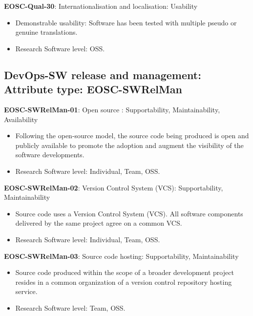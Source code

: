 \textbf{EOSC-Qual-30}: Internationalisation and localisation: Usability

\begin{itemize}
    \item Demonstrable usability: Software has been tested with multiple pseudo or genuine translations. \cite{shepherdson_cessda_2019}
    \item Research Software level: OSS.
\end{itemize}

\subsection{DevOps-SW release and management: Attribute type: EOSC-SWRelMan}

\textbf{EOSC-SWRelMan-01}: Open source : Supportability, Maintainability, Availability

\begin{itemize}
    \item Following the open-source model, the source code being produced is open and publicly available to promote the adoption and augment the visibility of the software developments. \cite{orviz_set_2017,raymond_software_2013}
    \item Research Software level: Individual, Team, OSS.
\end{itemize}

\textbf{EOSC-SWRelMan-02}: Version Control System (VCS): Supportability, Maintainability

\begin{itemize}
    \item Source code uses a Version Control System (VCS). All software components delivered by the same project agree on a common VCS. \cite{orviz_set_2017}
    \item Research Software level: Individual, Team, OSS.
\end{itemize}

\textbf{EOSC-SWRelMan-03}: Source code hosting: Supportability, Maintainability

\begin{itemize}
    \item Source code produced within the scope of a broader development project resides in a common organization of a version control repository hosting service. \cite{orviz_set_2017}
    \item Research Software level: Team, OSS.
\end{itemize}

